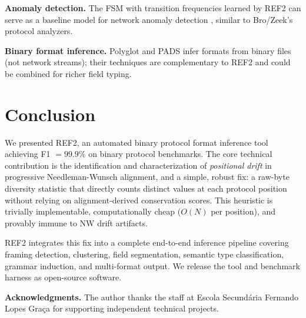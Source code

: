 \documentclass[letterpaper,twocolumn,10pt]{article}
\begin{document}
\textbf{Anomaly detection.}  The FSM with transition frequencies learned by
\textsc{REF2} can serve as a baseline model for network anomaly detection
\cite{bro,snort}, similar to Bro/Zeek's protocol analyzers.

\textbf{Binary format inference.}  Polyglot \cite{polyglot} and PADS
\cite{pads} infer formats from binary files (not network streams); their
techniques are complementary to \textsc{REF2} and could be combined for richer
field typing.

\section{Conclusion}
\label{sec:conclusion}

We presented \textsc{REF2}, an automated binary protocol format inference tool
achieving F1 $= 99.9\%$ on binary protocol benchmarks.  The core technical
contribution is the identification and characterization of \emph{positional
drift} in progressive Needleman-Wunsch alignment, and a simple, robust fix: a
raw-byte diversity statistic that directly counts distinct values at each
protocol position without relying on alignment-derived conservation scores.
This heuristic is trivially implementable, computationally cheap ($O(N)$ per
position), and provably immune to NW drift artifacts.

\textsc{REF2} integrates this fix into a complete end-to-end inference pipeline
covering framing detection, clustering, field segmentation, semantic type
classification, grammar induction, and multi-format output.  We release the
tool and benchmark harness as open-source software.

\medskip
\noindent\textbf{Acknowledgments.}  The author thanks the staff at Escola
Secund\'{a}ria Fernando Lopes Gra\c{c}a for supporting independent technical
projects.

\balance


\end{document}
